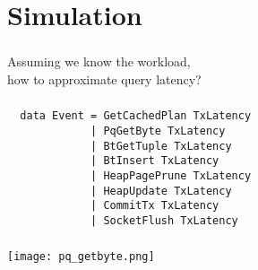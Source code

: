 \documentclass[usenames,dvipsnames, 18pt, compress, aspectratio=169]{beamer}
\begin{document}

\section{Simulation}

\begin{frame}[fragile]{}
    \frametitle{}

    Assuming we know the workload,\\
    how to approximate query latency?
\end{frame}

\begin{frame}[fragile]{}
    \frametitle{}

    \begin{verbatim}
  data Event = GetCachedPlan TxLatency
             | PqGetByte TxLatency
             | BtGetTuple TxLatency
             | BtInsert TxLatency
             | HeapPagePrune TxLatency
             | HeapUpdate TxLatency
             | CommitTx TxLatency
             | SocketFlush TxLatency
    \end{verbatim}

\end{frame}

\begin{frame}[fragile]{}
    \frametitle{}
    \begin{center}

        \texttt{[image: pq\_getbyte.png]}

    \end{center}
\end{frame}
\end{document}
